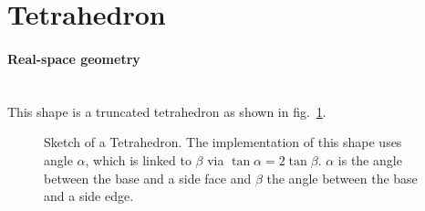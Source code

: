 
\newpage
\section{Tetrahedron}   
 
\paragraph{Real-space geometry}\mbox{}\\
This shape is a truncated tetrahedron as shown in fig.~\ref{fig:tetrahedron}.

\begin{figure}[ht]
\hfill
{}
\hfill
{}
\hfill
\caption{Sketch of a Tetrahedron. The implementation of this shape uses angle
  $\alpha$, which is linked to $\beta$ via $\tan \alpha = 2 \tan 
  \beta$. $\alpha$ is the angle between the base and a side face and $\beta$
  the angle between the base and a side edge.}
\label{fig:tetrahedron}
\end{figure}


